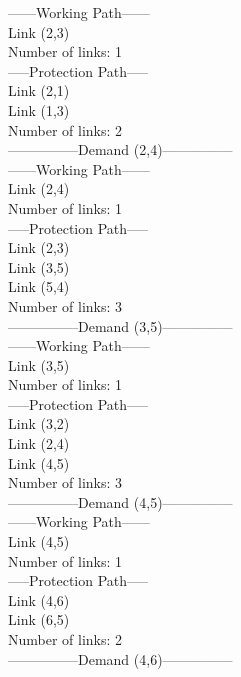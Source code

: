 ------Working Path------ \\
Link  (2,3) \\
Number of links: 1 \\

-----Protection Path----- \\
Link  (2,1) \\
Link  (1,3) \\
Number of links: 2 \\

---------------Demand (2,4)--------------- \\

------Working Path------ \\
Link  (2,4) \\
Number of links: 1 \\

-----Protection Path----- \\
Link  (2,3) \\
Link  (3,5) \\
Link  (5,4) \\
Number of links: 3 \\

---------------Demand (3,5)--------------- \\

------Working Path------ \\
Link  (3,5) \\
Number of links: 1 \\

-----Protection Path----- \\
Link  (3,2) \\
Link  (2,4) \\
Link  (4,5) \\
Number of links: 3 \\

---------------Demand (4,5)--------------- \\

------Working Path------ \\
Link  (4,5) \\
Number of links: 1 \\

-----Protection Path----- \\
Link  (4,6) \\
Link  (6,5) \\
Number of links: 2 \\

---------------Demand (4,6)--------------- \\


